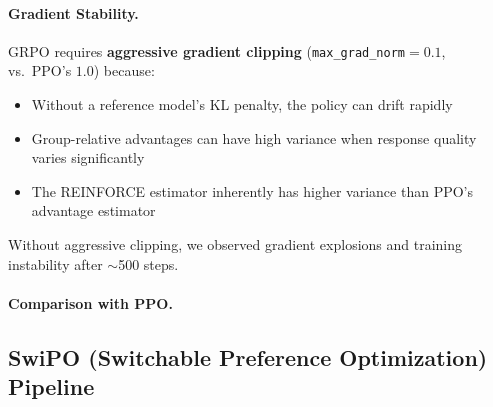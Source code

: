 \paragraph{Gradient Stability.} GRPO requires \textbf{aggressive gradient clipping} (\texttt{max\_grad\_norm}$=0.1$, vs.\ PPO's $1.0$) because:
\begin{itemize}[leftmargin=*]
    \item Without a reference model's KL penalty, the policy can drift rapidly
    \item Group-relative advantages can have high variance when response quality varies significantly
    \item The REINFORCE estimator inherently has higher variance than PPO's advantage estimator
\end{itemize}

Without aggressive clipping, we observed gradient explosions and training instability after $\sim$500 steps.

\paragraph{Comparison with PPO.}
\begin{table}[ht!]
\centering
{}
\caption{Key differences between the PPO and GRPO training pipelines.}
\label{tab:ppo_vs_grpo_comparison}
\end{table}

\subsection{SwiPO (Switchable Preference Optimization) Pipeline}
\label{sec:appendix_cita_pipeline}

